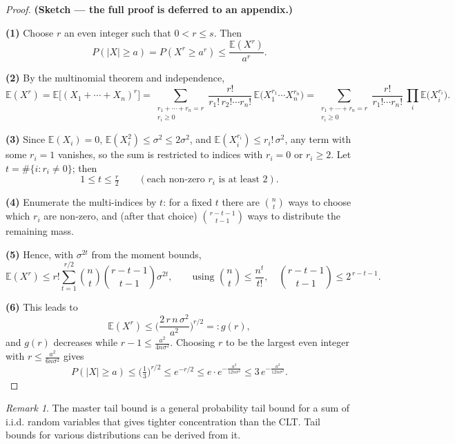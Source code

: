 \documentclass[
  letterpaper,
  DIV=11,
  numbers=noendperiod]{scrreprt}
\theoremstyle{definition}
\theoremstyle{plain}
\theoremstyle{plain}
\theoremstyle{definition}
\theoremstyle{plain}
\theoremstyle{plain}
\theoremstyle{remark}
\newtheorem*{remark}{Remark}
\begin{document}
\begin{proof}
\textbf{(Sketch --- the full proof is deferred to an appendix.)}

\textbf{(1)} Choose \(r\) an even integer such that \(0 < r \le s\).
Then \[
P(|X| \ge a) = P(X^r \ge a^r) \le \frac{\mathbb{E}(X^r)}{a^r}.
\]

\textbf{(2)} By the multinomial theorem and independence, \[
\mathbb{E}(X^r) = \mathbb{E}\Big[(X_1 + \cdots + X_n)^r\Big]
= \sum_{\substack{r_1 + \cdots + r_n = r \\ r_i \ge 0}} \frac{r!}{r_1!\, r_2! \cdots r_n!}\, \mathbb{E}\big(X_1^{r_1} \cdots X_n^{r_n}\big)
= \sum_{\substack{r_1 + \cdots + r_n = r \\ r_i \ge 0}} \frac{r!}{r_1! \cdots r_n!}\, \prod_i \mathbb{E}\big(X_i^{r_i}\big).
\]

\textbf{(3)} Since \(\mathbb{E}(X_i) = 0\),
\(\mathbb{E}(X_i^2) \le \sigma^2 \le 2\sigma^2\), and
\(\mathbb{E}(X_i^{r_i}) \le r_i!\, \sigma^2\), any term with some
\(r_i = 1\) vanishes, so the sum is restricted to indices with
\(r_i = 0\) or \(r_i \ge 2\). Let \(t = \#\{i : r_i \neq 0\}\); then \[
1 \le t \le \tfrac{r}{2} \qquad (\text{each non-zero } r_i \text{ is at least } 2).
\]

\textbf{(4)} Enumerate the multi-indices by \(t\): for a fixed \(t\)
there are \(\binom{n}{t}\) ways to choose which \(r_i\) are non-zero,
and (after that choice) \(\binom{r-t-1}{t-1}\) ways to distribute the
remaining mass.

\textbf{(5)} Hence, with \(\sigma^{2t}\) from the moment bounds, \[
\mathbb{E}(X^r) \le r! \sum_{t=1}^{r/2} \binom{n}{t}\binom{r-t-1}{t-1} \sigma^{2t},
\qquad \text{using } \binom{n}{t} \le \frac{n^t}{t!}, \quad \binom{r-t-1}{t-1} \le 2^{\,r-t-1}.
\]

\textbf{(6)} This leads to \[
\mathbb{E}(X^r) \le \Big(\frac{2\, r\, n\, \sigma^2}{a^2}\Big)^{r/2} =: g(r),
\] and \(g(r)\) decreases while \(r - 1 \le \tfrac{a^2}{4n\sigma^2}\).
Choosing \(r\) to be the largest even integer with
\(r \le \tfrac{a^2}{6 n \sigma^2}\) gives \[
P(|X| \ge a) \le \big(\tfrac{1}{3}\big)^{r/2} \le e^{-r/2} \le e \cdot e^{-\frac{a^2}{12 n \sigma^2}} \le 3\, e^{-\frac{a^2}{12 n \sigma^2}}.
\]
\end{proof}

\begin{remark}
The master tail bound is a general probability tail bound for a sum of
i.i.d. random variables that gives tighter concentration than the CLT.
Tail bounds for various distributions can be derived from it.
\end{remark}
\end{document}
